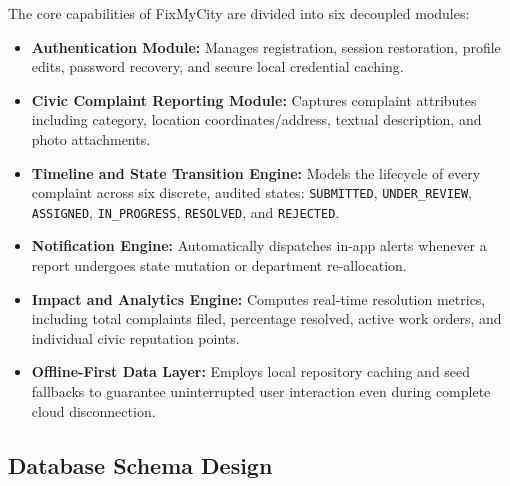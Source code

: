 \documentclass[conference]{IEEEtran}
\begin{document}
The core capabilities of FixMyCity are divided into six decoupled modules:
\begin{itemize}
    \item \textbf{Authentication Module:} Manages registration, session restoration, profile edits, password recovery, and secure local credential caching.
    \item \textbf{Civic Complaint Reporting Module:} Captures complaint attributes including category, location coordinates/address, textual description, and photo attachments.
    \item \textbf{Timeline and State Transition Engine:} Models the lifecycle of every complaint across six discrete, audited states: \texttt{SUBMITTED}, \texttt{UNDER\_REVIEW}, \texttt{ASSIGNED}, \texttt{IN\_PROGRESS}, \texttt{RESOLVED}, and \texttt{REJECTED}.
    \item \textbf{Notification Engine:} Automatically dispatches in-app alerts whenever a report undergoes state mutation or department re-allocation.
    \item \textbf{Impact and Analytics Engine:} Computes real-time resolution metrics, including total complaints filed, percentage resolved, active work orders, and individual civic reputation points.
    \item \textbf{Offline-First Data Layer:} Employs local repository caching and seed fallbacks to guarantee uninterrupted user interaction even during complete cloud disconnection.
\end{itemize}

\subsection{Database Schema Design}
\end{document}
